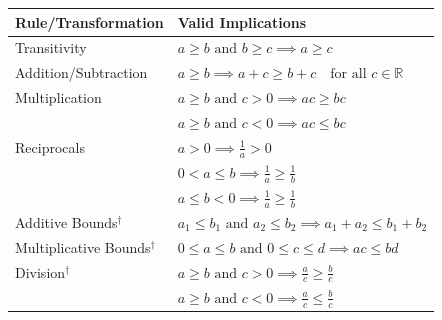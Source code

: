 \renewcommand{\arraystretch}{1.4} %
\vspace{-0.2in}
\begin{center}
\begin{tabular}{|p{3.5cm}|p{11.1cm}|}
\hline
\textbf{Rule/Transformation} & \textbf{Valid Implications} \\
\hline
Transitivity &
\( a \geq b \text{ and } b \geq c \implies a \geq c \) \\
\hline
Addition/Subtraction &
\( a \geq b \implies a + c \geq b + c \quad \text{for all } c \in \mathbb{R} \) \\
\hline
Multiplication &
\( a \geq b \text{ and } c > 0 \implies ac \geq bc \) \\
& \( a \geq b \text{ and } c < 0 \implies ac \leq bc \) \\
\hline
Reciprocals &
\(a>0 \implies \frac{1}{a}>0\) \\
&\( 0 < a \leq b \implies \frac{1}{a} \geq \frac{1}{b} \) \\
& \( a \leq b < 0 \implies \frac{1}{a} \geq \frac{1}{b} \) \\
\hline
Additive Bounds$^\dagger$ &
\( a_1 \leq b_1 \text{ and } a_2 \leq b_2 \implies a_1 + a_2 \leq b_1 + b_2 \) \\
\hline
Multiplicative Bounds$^\dagger$ &
\( 0 \leq a \leq b \text{ and } 0 \leq c \leq d \implies ac \leq bd \) \\
\hline
Division$^\dagger$ &
\( a \geq b \text{ and } c > 0 \implies \frac{a}{c} \geq \frac{b}{c} \) \\
& \( a \geq b \text{ and } c < 0 \implies \frac{a}{c} \leq \frac{b}{c} \) \\

\end{tabular}
\end{center}
